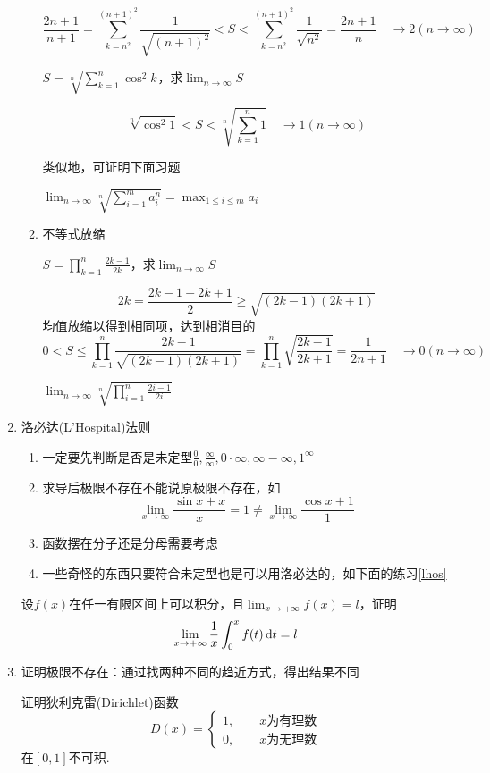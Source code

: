 \begin{enumerate}
\begin{enumerate}
\begin{example}
		\end{example}
		\begin{analysis}\[\frac{2n+1}{n+1}=\sum _{k=n^2}^{(n+1)^2}\frac{1}{\sqrt{(n+1)^2}}<S<\sum _{k=n^2}^{(n+1)^2}\frac{1}{\sqrt{n^2}}=\frac{2n+1}{n}\quad\to 2(n\to\infty)\]
		\end{analysis}
		\begin{example}
		\label{jb2}
		$\displaystyle S=\sqrt[n]{\sum_{k=1}^{n}\cos^2 k}$，求$\displaystyle\lim_{n\to\infty}S$
		\end{example}
		\begin{analysis}
		\[\sqrt[n]{\cos^2 1}<S<\sqrt[n]{\sum_{k=1}^{n}1}\quad\to 1(n\to\infty)\]
		\end{analysis}
		类似地，可证明下面习题
		\begin{exercise}
		$\displaystyle \lim_{n\to\infty}\sqrt[n]{\sum_{i=1}^{m}a_i^n}=\max_{1\leq i\leq m}a_i$
		\end{exercise}
		\item 不等式放缩
		\begin{example}
		$\displaystyle S=\prod_{k=1}^{n}\frac{2k-1}{2k}$，求$\displaystyle\lim_{n\to\infty}S$
		\end{example}
		\begin{analysis}
		\[2k=\frac{2k-1+2k+1}{2}\ge\sqrt{(2k-1)(2k+1)}\]
		均值放缩以得到相同项，达到相消目的
		\[0<S\leq\prod_{k=1}^{n}\frac{2k-1}{\sqrt{(2k-1)(2k+1)}}=\prod_{k=1}^{n}\sqrt{\frac{2k-1}{2k+1}}=\frac{1}{2n+1}\quad\to 0(n\to\infty)\]
		\end{analysis}
		\begin{exercise}
		$\displaystyle\lim_{n\to\infty}\sqrt[n]{\prod_{i=1}^{n}\frac{2i-1}{2i}}$
		\end{exercise}
	\end{enumerate}
	\item 洛必达(L'Hospital)法则
	\begin{enumerate}
		\item 一定要先判断是否是未定型$\displaystyle\frac{0}{0},\frac{\infty}{\infty},0\cdot\infty,\infty-\infty,1^\infty$
		\item 求导后极限不存在不能说原极限不存在，如
		\[\lim_{x\to\infty}\frac{\sin x+x}{x}=1\ne\lim_{x\to\infty}\frac{\cos x+1}{1}\]
		\item 函数摆在分子还是分母需要考虑
		\item 一些奇怪的东西只要符合未定型也是可以用洛必达的，如下面的练习\ref{lhos}
	\end{enumerate}
	\begin{exercise}
	\label{lhos}
	设$f(x)$在任一有限区间上可以积分，且$\displaystyle\lim_{x\to+\infty}f(x)=l$，证明
	\[\lim_{x\to+\infty}\frac{1}{x}\int_0^xf(t)\,\mathrm{d} t=l\]
	\end{exercise}
	\item 证明极限不存在：通过找两种不同的趋近方式，得出结果不同
	\begin{exercise}
	证明狄利克雷(Dirichlet)函数
	\[D(x)=\begin{cases}
	1,\qquad x\mbox{为有理数}\\
	0,\qquad x\mbox{为无理数}\end{cases}\]
	在$[0,1]$不可积.
	\end{exercise}
\end{enumerate}
